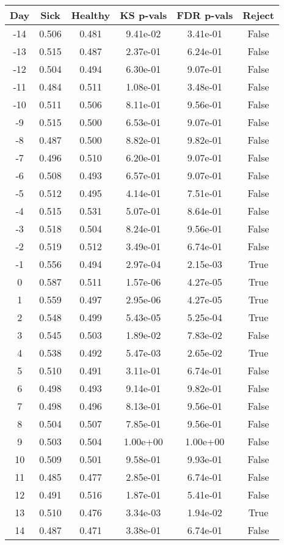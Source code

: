 \begin{tabular}{c|c|c|c|c|c}
Day &  Sick & Healthy &  KS p-vals & FDR p-vals & Reject\\
\hline
-14 & 0.506 &   0.481 &   9.41e-02 &   3.41e-01 &  False\\
-13 & 0.515 &   0.487 &   2.37e-01 &   6.24e-01 &  False\\
-12 & 0.504 &   0.494 &   6.30e-01 &   9.07e-01 &  False\\
-11 & 0.484 &   0.511 &   1.08e-01 &   3.48e-01 &  False\\
-10 & 0.511 &   0.506 &   8.11e-01 &   9.56e-01 &  False\\
 -9 & 0.515 &   0.500 &   6.53e-01 &   9.07e-01 &  False\\
 -8 & 0.487 &   0.500 &   8.82e-01 &   9.82e-01 &  False\\
 -7 & 0.496 &   0.510 &   6.20e-01 &   9.07e-01 &  False\\
 -6 & 0.508 &   0.493 &   6.57e-01 &   9.07e-01 &  False\\
 -5 & 0.512 &   0.495 &   4.14e-01 &   7.51e-01 &  False\\
 -4 & 0.515 &   0.531 &   5.07e-01 &   8.64e-01 &  False\\
 -3 & 0.518 &   0.504 &   8.24e-01 &   9.56e-01 &  False\\
 -2 & 0.519 &   0.512 &   3.49e-01 &   6.74e-01 &  False\\
 -1 & 0.556 &   0.494 &   2.97e-04 &   2.15e-03 &   True\\
  0 & 0.587 &   0.511 &   1.57e-06 &   4.27e-05 &   True\\
  1 & 0.559 &   0.497 &   2.95e-06 &   4.27e-05 &   True\\
  2 & 0.548 &   0.499 &   5.43e-05 &   5.25e-04 &   True\\
  3 & 0.545 &   0.503 &   1.89e-02 &   7.83e-02 &  False\\
  4 & 0.538 &   0.492 &   5.47e-03 &   2.65e-02 &   True\\
  5 & 0.510 &   0.491 &   3.11e-01 &   6.74e-01 &  False\\
  6 & 0.498 &   0.493 &   9.14e-01 &   9.82e-01 &  False\\
  7 & 0.498 &   0.496 &   8.13e-01 &   9.56e-01 &  False\\
  8 & 0.504 &   0.507 &   7.85e-01 &   9.56e-01 &  False\\
  9 & 0.503 &   0.504 &   1.00e+00 &   1.00e+00 &  False\\
 10 & 0.509 &   0.501 &   9.58e-01 &   9.93e-01 &  False\\
 11 & 0.485 &   0.477 &   2.85e-01 &   6.74e-01 &  False\\
 12 & 0.491 &   0.516 &   1.87e-01 &   5.41e-01 &  False\\
 13 & 0.510 &   0.476 &   3.34e-03 &   1.94e-02 &   True\\
 14 & 0.487 &   0.471 &   3.38e-01 &   6.74e-01 &  False\\
\end{tabular}
